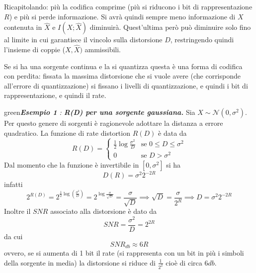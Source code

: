 Ricapitolando: più la codifica comprime (più si riducono i bit di rappresentazione $R$) e più si perde informazione. Si avrà quindi sempre meno informazione di $X$ contenuta in $\hat{X}$ e $I(X; \hat{X})$ diminuir\`a. Quest'ultima per\`o può diminuire solo fino al limite in cui garantisce il vincolo sulla distorsione $D$, restringendo quindi l'insieme di coppie ($X, \hat{X})$ ammissibili.

Se si ha una sorgente continua  e la si quantizza questa  è  una  forma  di  codifica  con  perdita: fissata  la  massima distorsione che si vuole avere (che corrisponde all’errore di quantizzazione) si fissano i livelli di quantizzazione, e quindi i bit di rappresentazione, e quindi il rate.

\begin{mybox}{green}{\textit{\textbf{Esempio 1} : \textbf{R(D) per una sorgente gaussiana. }}}
Sia $X \sim \mathcal{N}(0, \sigma^2)$. Per questo genere di sorgenti \`e ragionevole adottare la distanza a errore quadratico. La funzione di rate distortion $R(D)$ \`e data da
\begin{equation*}
    R(D) = \begin{cases}
    \frac{1}{2} \log \frac{\sigma^2}{D} & \text{se } 0 \leq D \leq \sigma^2 \\
    0 & \text{se } D > \sigma^2
    \end{cases}
\end{equation*}
Dal momento che la funzione \`e invertibile in $[0, \sigma^2]$ si ha
\begin{equation*}
    D(R) = \sigma^2 2^{-2R}
\end{equation*}
infatti 
\begin{equation*}
    2^{R(D)} = 2^{\frac{1}{2} \log (\frac{\sigma^2}{D})} = 2^{\log \frac{\sigma}{\sqrt{D}}} = \frac{\sigma}{\sqrt{D}} \implies \sqrt{D} = \frac{\sigma}{2^R} \implies D = \sigma^2 2^{-2R}
\end{equation*}
Inoltre il $SNR$ associato alla distorsione \`e dato da
\begin{equation*}
    SNR = \frac{\sigma^2}{D} = 2^{2R}
\end{equation*}
da cui
\begin{equation*}
    SNR_{db} \approx 6R
\end{equation*}
ovvero, se si aumenta di 1 bit il rate (si rappresenta con un bit in più i simboli della sorgente in media) la
distorsione si riduce di $\frac{1}{2^2}$ cio\`e di circa $6 db$.
\end{mybox}


